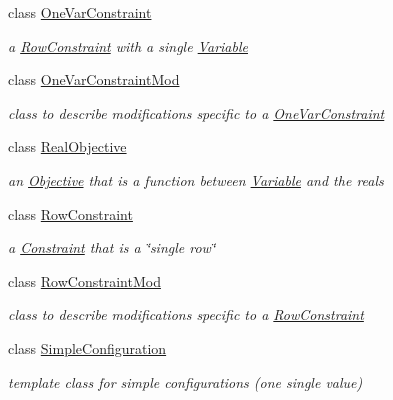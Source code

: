 \begin{DoxyCompactItemize}
class \mbox{\hyperlink{class_s_m_spp__di__unipi__it_1_1_one_var_constraint}{One\+Var\+Constraint}}
\begin{DoxyCompactList}\small\item\em a \mbox{\hyperlink{class_s_m_spp__di__unipi__it_1_1_row_constraint}{Row\+Constraint}} with a single \mbox{\hyperlink{class_s_m_spp__di__unipi__it_1_1_variable}{Variable}} \end{DoxyCompactList}\item 
class \mbox{\hyperlink{class_s_m_spp__di__unipi__it_1_1_one_var_constraint_mod}{One\+Var\+Constraint\+Mod}}
\begin{DoxyCompactList}\small\item\em class to describe modifications specific to a \mbox{\hyperlink{class_s_m_spp__di__unipi__it_1_1_one_var_constraint}{One\+Var\+Constraint}} \end{DoxyCompactList}\item 
class \mbox{\hyperlink{class_s_m_spp__di__unipi__it_1_1_real_objective}{Real\+Objective}}
\begin{DoxyCompactList}\small\item\em an \mbox{\hyperlink{class_s_m_spp__di__unipi__it_1_1_objective}{Objective}} that is a function between \mbox{\hyperlink{class_s_m_spp__di__unipi__it_1_1_variable}{Variable}} and the reals \end{DoxyCompactList}\item 
class \mbox{\hyperlink{class_s_m_spp__di__unipi__it_1_1_row_constraint}{Row\+Constraint}}
\begin{DoxyCompactList}\small\item\em a \mbox{\hyperlink{class_s_m_spp__di__unipi__it_1_1_constraint}{Constraint}} that is a \char`\"{}single row\char`\"{} \end{DoxyCompactList}\item 
class \mbox{\hyperlink{class_s_m_spp__di__unipi__it_1_1_row_constraint_mod}{Row\+Constraint\+Mod}}
\begin{DoxyCompactList}\small\item\em class to describe modifications specific to a \mbox{\hyperlink{class_s_m_spp__di__unipi__it_1_1_row_constraint}{Row\+Constraint}} \end{DoxyCompactList}\item 
class \mbox{\hyperlink{class_s_m_spp__di__unipi__it_1_1_simple_configuration}{Simple\+Configuration}}
\begin{DoxyCompactList}\small\item\em template class for simple configurations (one single value) \end{DoxyCompactList}\item 

\end{DoxyCompactItemize}
